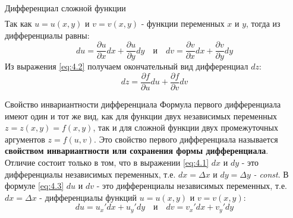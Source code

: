 \begin{tbox}{Дифференциал сложной функции}
\begin{equation}
\begin{split}
		\end{split}
	\end{equation}
	Так как $u = u(x,y)$ и $v = v(x,y)$ - функции переменных $x$ и $y$, тогда из дифференциалы равны:
	\begin{equation*}
		du = \frac{\partial u}{\partial x} dx + \frac{\partial u}{\partial y} dy \quad \text{и} \quad dv = \frac{\partial v}{\partial x} dx + \frac{\partial v}{\partial y} dy
	\end{equation*}
	Из выражения \cref{eq:4.2} получаем окончательный вид дифференциал $dz$:
	\begin{equation}	\label{eq:4.3}
		\boxed{dz = \frac{\partial f}{\partial u} du + \frac{\partial f}{\partial v} dv}
	\end{equation}
\end{tbox}

\begin{tbox}{Свойство инвариантности дифференциала}
	Формула первого дифференциала имеют один и тот же вид, как для функции двух независимых переменных $z = z(x,y) = f(x,y)$, так и для сложной функции двух промежуточных аргументов $z = f(u,v)$. Это свойство первого дифференциала называется \textbf{свойством инвариантности или сохранения формы дифференциала}. \\

	Отличие состоит только в том, что в выражении \cref{eq:4.1} $dx$ и $dy$ - это дифференциалы независимых переменных, т.е. $dx = \Delta x$ и $dy = \Delta y$ \textit{- const}. В формуле \cref{eq:4.3} $du$ и $dv$ - это дифференциалы независимых переменных, т.е. $dx = \Delta x$ - дифференциалы функций $u = u(x,y)$ и $v = v(x,y)$:
	\[du = u_x' dx + u_y'dy \quad \text{и} \quad dv = v_x' dx + v_y'dy\]
\end{tbox}

